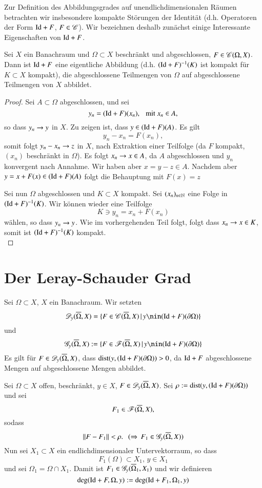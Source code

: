 Zur Definition des Abbildungsgrades auf unendlichdimensionalen Räumen betrachten wir insbesondere
kompakte Störungen der Identität (d.h. Operatoren der Form $\mathrm{Id}+F$, $F\in \mathscr C$). Wir bezeichnen deshalb
zunächst einige Interessante Eigenschaften von $\mathrm{Id}+F$.

\begin{lem}\label{3.7}
    Sei $X$ ein Banachraum und $\Omega\subset X$ beschränkt und abgeschlossen, $F\in \mathscr C(\Omega,X)$.
    Dann ist $\mathrm{Id} + F$ eine eigentliche Abbildung (d.h. $(\mathrm{Id}+F)^{-1}(K)$ ist kompakt für $K\subset X$ 
    kompakt), die abgeschlossene Teilmengen von $\Omega$ auf abgeschlossene Teilmengen von $X$ abbildet.
\end{lem}

\begin{proof}
    Sei $A\subset \Omega$ abgeschlossen, und sei
    \[
        y_n=(\mathrm{Id}+F)(x_n), \hspace{.25cm} \text{mit } x_n \in A,
    \]
    so dass $y_n \rightarrow y$ in $X$. Zu zeigen ist, dass $y\in (\mathrm{Id}+F)(A)$. Es gilt
    \[
        y_n-x_n=F(x_n),
    \]
    somit folgt $y_n-x_n\rightarrow z$ in $X$, nach Extraktion einer Teilfolge (da $F$ kompakt, $(x_n)$
    beschränkt in $\Omega$). Es folgt $x_n\rightarrow x \in A$, da $A$ abgeschlossen und $y_n$ konvergent
    nach Annahme. Wir haben aber $x=y-z\in A$. Nachdem aber $y=x+F(x)\in (\mathrm{Id}+F)(A)$ folgt die Behauptung
    mit $F(x)=z$

    Sei nun $\Omega$ abgeschlossen und $K\subset X$ kompakt. Sei $(x_n)_{n\in \mathbb{N}}$ eine Folge in
    $(\mathrm{Id}+F)^{-1}(K)$. Wir können wieder eine Teilfolge
    \[
        K\ni y_n=x_n+F(x_n)
    \]
    wählen, so dass $y_n\rightarrow y$. Wie im vorhergehenden Teil folgt, folgt dass $x_n\rightarrow x\in K$, somit ist
    $(\mathrm{Id}+F)^{-1}(K)$ kompakt.
    \[ \]
\end{proof}

\section{Der Leray-Schauder Grad}

Sei $\Omega\subset X$, $X$ ein Banachraum. Wir setzten
\[
    \ms D_y(\ol \Omega,X)=\{ F\in \ms C(\ol\Omega,X)\, | \, y\nin(\Id + F)(\partial \Omega) \}
\]
und
\[
    \ms G_y(\ol\Omega,X):=\{F\in \ms F(\ol \Omega,X)\, |\, y\nin(\Id+F)(\partial\Omega)\}
\]
Es gilt für $F\in \mathscr D_y(\overline \Omega,X)$, dass $\mathrm{dist}(y,(\mathrm{Id}+F)(\partial\Omega))>0$, da $\mathrm{Id}+F$
abgeschlossene Mengen auf abgeschlossene Mengen abbildet.

\begin{defi}\label{3.8}
    Sei $\Omega\subset X$ offen, beschränkt, $y\in X$, $F\in \mathscr D_y(\overline \Omega,X)$. Sei $\rho:=
    \mathrm{dist}(y,(\mathrm{Id}+F)(\partial \Omega))$ und sei
    \[
        F_1\in \mathscr F(\overline \Omega, X),
    \]
    sodass
    \[
        \|F-F_1\|<\rho. \hspace{.25cm} (\Rightarrow \, F_1\in \mathscr G_y(\overline \Omega,X))
    \]
    Nun sei $X_1\subset X$ ein endlichdimensionaler Untervektorraum, so dass
    \[
        F_1(\Omega)\subset X_1,\, y\in X_1
    \] 
    und sei $\Omega_1=\Omega\cap X_1$. Damit ist $F_1\in \mathscr G_y(\overline\Omega_1,X_1)$ und wir definieren
    \[
        \deg(\mathrm{Id}+F,\Omega,y):=\deg(\mathrm{Id}+F_1,\Omega_1,y)
    \]
\end{defi}

